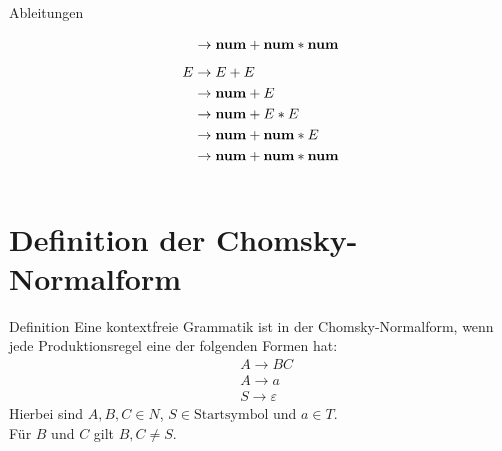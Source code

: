 \documentclass[t]{beamer}
\begin{document}
\begin{frame}
\begin{columns}[T]
\begin{column}{0.33\textwidth}
\begin{block}{Ableitungen}
\begin{minipage}[t]{\linewidth}
\begin{align*}
                            & \phantom{E} \rightarrow \bold{num} + \bold{num} * \bold{num} \\
                        \end{align*}
                        \vspace{-2em}
                        \begin{align*}
                            & E \rightarrow E + E \\
                            & \phantom{E} \rightarrow \bold{num} + E \\
                            & \phantom{E} \rightarrow \bold{num} + E * E \\
                            & \phantom{E} \rightarrow \bold{num} + \bold{num} * E \\
                            & \phantom{E} \rightarrow \bold{num} + \bold{num} * \bold{num} \\
                        \end{align*}
                    \end{minipage}
                \end{block}
            \end{column}
        \end{columns}
    \end{frame}


    \section{Definition der Chomsky-Normalform}\label{sec:chomsky-normal-form-definition}
    \begin{frame}
        \begin{block}{Definition\cite{watrous2020}}
            Eine kontextfreie Grammatik ist in der Chomsky-Normalform, wenn jede Produktionsregel eine der folgenden Formen hat:
            \begin{align*}
                & A \rightarrow BC \\
                & A \rightarrow a \\
                & S \rightarrow \varepsilon
            \end{align*}
            Hierbei sind $A,B,C \in N$, $S \in \text{Startsymbol}$ und $a \in T$. \\
            Für $B$ und $C$ gilt $B,C \neq S$.
        \end{block}
    \end{frame}
\end{document}
